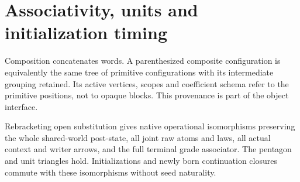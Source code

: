 \documentclass[11pt]{article}
\begin{document}
\section{Associativity, units and initialization timing}
Composition concatenates words. A parenthesized composite configuration is equivalently the same tree of primitive configurations with its intermediate grouping retained. Its active vertices, scopes and coefficient schema refer to the primitive positions, not to opaque blocks. This provenance is part of the object interface.

\begin{theorem}
Rebracketing open substitution gives native operational isomorphisms preserving the whole shared-world post-state, all joint raw atoms and laws, all actual context and writer arrows, and the full terminal grade associator. The pentagon and unit triangles hold. Initializations and newly born continuation closures commute with these isomorphisms without seed naturality.
\end{theorem}
\end{document}

